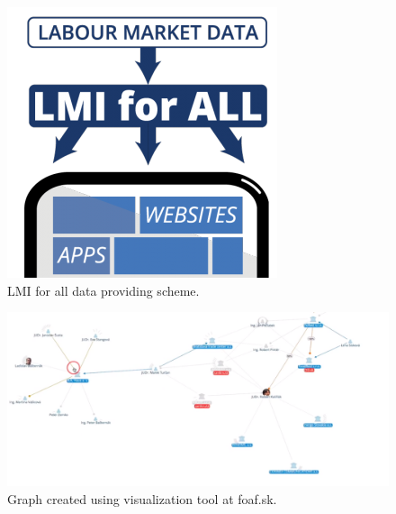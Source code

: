\documentclass[thesis=B,english]{FITthesis}[2012/06/26]
\begin{document}
{\begin{figure}[H]
	\centering
	\includegraphics[scale=0.5]{pictures/LMIForAll.png}
  	\caption{LMI for all data providing scheme. \cite{lmiforall}}
  	\label{fig:LMI for all}
\end{figure}

\begin{figure}[H]
  \includegraphics[width=\linewidth]{pictures/foafskgraph.png}
  \caption{Graph created using visualization tool at foaf.sk.}
  \label{fig:foafGraph}
\end{figure}

}
\end{document}
